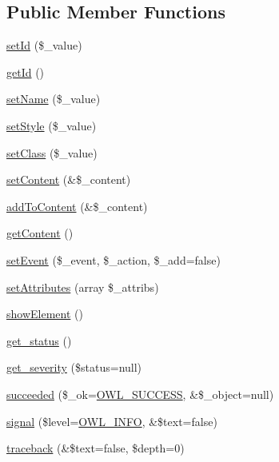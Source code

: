 \subsection*{Public Member Functions}
\begin{DoxyCompactItemize}
\item 
\hyperlink{classBaseElement_a0c1ce3d1684ecb78960cf7a97278494e}{setId} (\$\_\-value)
\item 
\hyperlink{classBaseElement_a4a7aa583ee21af392908d7fd42fde790}{getId} ()
\item 
\hyperlink{classBaseElement_a39bafb3609d10048920c20242c2a04c5}{setName} (\$\_\-value)
\item 
\hyperlink{classBaseElement_a6b2b9ff69f6e92db82f91d9c55cda697}{setStyle} (\$\_\-value)
\item 
\hyperlink{classBaseElement_af6597b30fa9798878f6290271043dfa2}{setClass} (\$\_\-value)
\item 
\hyperlink{classBaseElement_a164a9c6e4ee68afa0ad343942ba54d28}{setContent} (\&\$\_\-content)
\item 
\hyperlink{classBaseElement_abd48eef64ca4f419f26d66a0c0419908}{addToContent} (\&\$\_\-content)
\item 
\hyperlink{classBaseElement_af8c86b93bcdcfbc415bf96c622dc5516}{getContent} ()
\item 
\hyperlink{classBaseElement_ad5789f45f16aaa144716ee8558069c31}{setEvent} (\$\_\-event, \$\_\-action, \$\_\-add=false)
\item 
\hyperlink{classBaseElement_a7d8ddd64ceb3401a7cb84548656b3709}{setAttributes} (array \$\_\-attribs)
\item 
\hyperlink{classBaseElement_a63634d81fad745e3b72cda0100afebea}{showElement} ()
\item 
\hyperlink{class__OWL_a99ec771fa2c5c279f80152cc09e489a8}{get\_\-status} ()
\item 
\hyperlink{class__OWL_adf9509ef96858be7bdd9414c5ef129aa}{get\_\-severity} (\$status=null)
\item 
\hyperlink{class__OWL_a53ab4d3bbb2c6a56966c339ca4b4c805}{succeeded} (\$\_\-ok=\hyperlink{owl_8severitycodes_8php_a96223f06ba27bf5cbefa6e9d702897c2}{OWL\_\-SUCCESS}, \&\$\_\-object=null)
\item 
\hyperlink{class__OWL_a51ba4a16409acf2a2f61f286939091a5}{signal} (\$level=\hyperlink{owl_8severitycodes_8php_a139328861128689f2f4def6a399d9057}{OWL\_\-INFO}, \&\$text=false)
\item 
\hyperlink{class__OWL_aa29547995d6741b7d2b90c1d4ea99a13}{traceback} (\&\$text=false, \$depth=0)
\end{DoxyCompactItemize}
